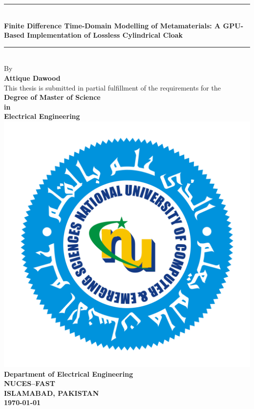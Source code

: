 
\begin{titlepage}
\begin{center}

\rule{\linewidth}{0.5mm}\\[0.3cm]
{\Large \bfseries Finite Difference Time-Domain Modelling of Metamaterials: A GPU-Based Implementation of Lossless Cylindrical Cloak}\\
\rule{\linewidth}{0.5mm}\\[0.5cm]

{\large By}\\[0.5cm]
{\large \bfseries Attique Dawood}\\[1cm]

{\large This thesis is submitted in partial fulfillment of the requirements for the}\\[1cm]
{\large \bfseries Degree of Master of Science\\[0.2cm] in\\[0.2cm] Electrical Engineering}\\[2cm]

\includegraphics[scale=0.15]{NU_Logo.png}\\[2cm]

{\large \bfseries Department of Electrical Engineering}\\[0.2cm]
{\large \bfseries NUCES--FAST}\\[0.2cm]
{\large \bfseries ISLAMABAD, PAKISTAN}\\[0.2cm]
{\large \bfseries \today}

\end{center}
\end{titlepage}